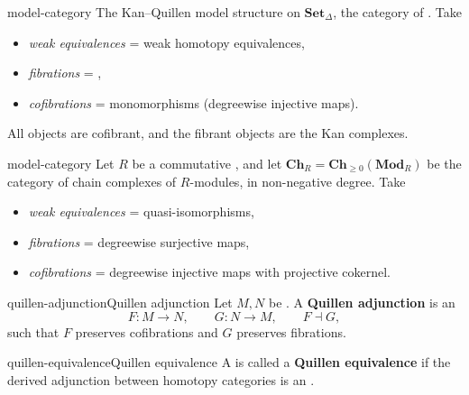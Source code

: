 \begin{example}{model-category}
    The Kan--Quillen model structure on $\textbf{Set}_\Delta$, the category of . Take
    \begin{itemize}
        \item \textit{weak equivalences} = weak homotopy equivalences,
        \item \textit{fibrations} = ,
        \item \textit{cofibrations} = monomorphisms (degreewise injective maps).
    \end{itemize}
    All objects are cofibrant, and the fibrant objects are the Kan complexes.
\end{example}

\begin{example}{model-category}
    Let $R$ be a commutative , and let $\textbf{Ch}_R = \textbf{Ch}_{\ge 0}(\textbf{Mod}_R)$ be the category of chain complexes of $R$-modules, in non-negative degree. Take
    \begin{itemize}
        \item \textit{weak equivalences} = quasi-isomorphisms,
        \item \textit{fibrations} = degreewise surjective maps,
        \item \textit{cofibrations} = degreewise injective maps with projective cokernel.
    \end{itemize}
\end{example}

\begin{topic}{quillen-adjunction}{Quillen adjunction}
    Let $M, N$ be . A \textbf{Quillen adjunction} is an 
    \[ F : M \to N, \qquad G : N \to M, \qquad F \dashv G , \]
    such that $F$ preserves cofibrations and $G$ preserves fibrations.
\end{topic}

\begin{topic}{quillen-equivalence}{Quillen equivalence}
    A  is called a \textbf{Quillen equivalence} if the derived adjunction between homotopy categories is an .
\end{topic}

